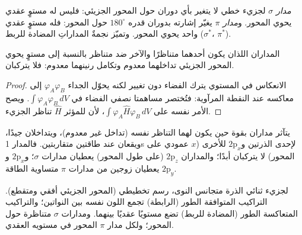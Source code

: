 \begin{definition}\label{def:b2:diatomic-mos:sigma-pi}
\emph{مدار $\sigma$} لجزيء خطي لا يتغير بأي
دوران حول المحور الجزيئي: فليس له مستوٍ عقدي يحوي المحور.
و\emph{مدار $\pi$} يغيّر إشارته بدوران قدره $180^\circ$ حول
المحور: فله مستوٍ عقدي واحد يحوي المحور. وتميّز نجمةٌ المداراتِ
المضادة للربط ($\sigma^*$، $\pi^*$).
\end{definition}

\begin{proposition}\label{prop:b2:diatomic-mos:symmetry}
المداران اللذان يكون أحدهما متناظرًا والآخر ضد متناظر بالنسبة إلى
مستوٍ يحوي المحور الجزيئي تداخلهما معدوم وتكامل رنينهما
معدوم: فلا يتركبان.
\end{proposition}

\begin{proof}
الانعكاس في المستوي يترك الفضاء دون تغيير لكنه يحوّل الجداء
$\varphi_A\varphi_B$ إلى معاكسه عند النقطة المرآوية: فتُختصر مساهمتا
نصفي الفضاء في $\int\varphi_A\varphi_B\,dV$. ويصح الأمر نفسه على
$\int\varphi_A\hat H\varphi_B\,dV$، لأن للمؤثر $\hat H$ تناظر الجزيء.
\end{proof}

يتآثر مداران بقوة حين يكون لهما التناظر نفسه (تداخل غير
معدوم)، ويتداخلان جيدًا، ويقعان عند طاقتين متقاربتين. فالمدار 1s لإحدى الذرتين 
و$2\mathrm p_x$ للأخرى ($x$ عمودي على المحور) لا يتركبان أبدًا؛
والمداران $2\mathrm p_z$ (على طول المحور) يعطيان مدارات $\sigma$؛ و$2\mathrm p_x$ 
و$2\mathrm p_y$ يعطيان زوجين من مدارات $\pi$ متساوية الطاقة.

\begin{omfigure}

{\small {} لجزيء ثنائي الذرة متجانس النوى، رسم تخطيطي (المحور
الجزيئي أفقي ومتقطع). التراكيب المتوافقة الطور (الرابطة) تجمع
اللون نفسه بين النواتين؛ والتراكيب المتعاكسة الطور (المضادة للربط) تضع
مستويًا عقديًا بينهما. ومدارات $\sigma$ متناظرة حول المحور؛ ولكل مدار $\pi$
المحور في مستويه العقدي.}
\end{omfigure}

